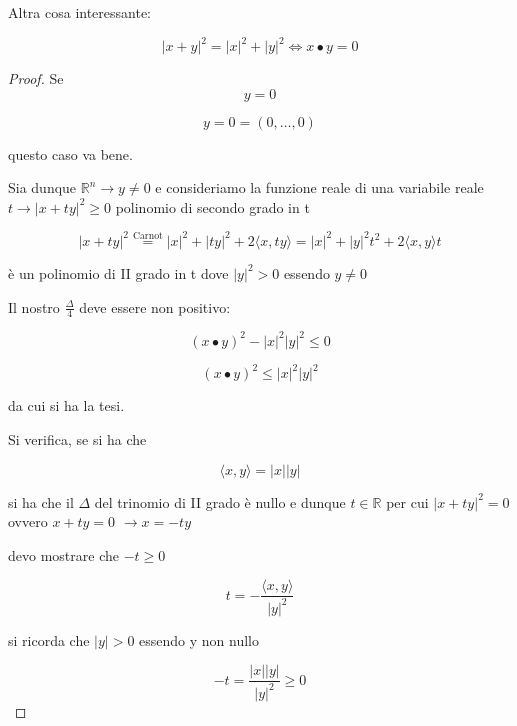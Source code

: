 \documentclass[11pt]{article}
\begin{document}
Altra cosa interessante:

 \[
    |x+y|^{2}= |x|^{2} + |y|^{2} \Leftrightarrow x\bullet y  =0
 \]




 \begin{proof}
     Se
     \[
        y=0
     \]

     \[
         y=0=(0, \ldots ,0) 
     \]
     
     questo caso va bene.

     Sia dunque $\mathbb{R}^{n} \rightarrow y \neq 0$ e consideriamo la funzione reale di una variabile reale $t \rightarrow |x+ty|^{2}\ge 0$ polinomio di secondo grado in t

     \[
         |x + ty| ^{2} \overset{\text{Carnot}}{=} |x|^{2} + |ty|^{2} + 2\langle x,ty \rangle  = |x|^{2} + |y|^{2}t^{2} + 2 \langle x,y \rangle t
     \]

     è un polinomio di II grado in t dove $|y|^{2}> 0 $ essendo $y \neq 0$

     Il nostro $\frac{\Delta}{4}$ deve essere non positivo:

     \[
         (x\bullet y ) ^{2} - |x| ^{2}|y|^{2} \le 0
     \]

     \[
         (x\bullet y ) ^{2}\le  |x| ^{2}|y|^{2} 
     \]

     da cui si ha la tesi.

     Si verifica, se si ha che

     \[
         \langle x,y \rangle = |x| |y|
     \]

     si ha che il $\Delta$ del trinomio di II grado è nullo e dunque $t \in \mathbb{R}$ per cui $|x+ty|^{2}=0$ ovvero $x +ty=0$ $\rightarrow x=-ty$

     devo mostrare che $-t \ge 0$


     \[
         t = - \frac{\langle x,y \rangle}{|y|^{2}}
     \]

     si ricorda che $|y|>0$ essendo y non nullo

     \[
         -t = \frac{|x| |y|}{|y|^{2}}\ge 0
     \]

 \end{proof}
\end{document}
